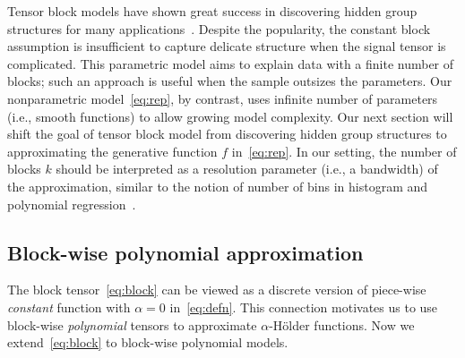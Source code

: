 \documentclass[12pt]{article}
\theoremstyle{definition}
\begin{document}
Tensor block models have shown great success in discovering hidden group structures for many applications~\cite{wang2019multiway,han2020exact}. Despite the popularity, the constant block assumption is insufficient to capture delicate structure when the signal tensor is complicated. 
This parametric model aims to explain data with a finite number of blocks; such an approach is useful when the sample outsizes the parameters. Our nonparametric model~\eqref{eq:rep}, by contrast, uses infinite number of parameters (i.e., smooth functions) to allow growing model complexity. Our next section will shift the goal of tensor block model from discovering hidden group structures to approximating the generative function $f$ in~\eqref{eq:rep}. In our setting, the number of blocks $k$ should be interpreted as a resolution parameter (i.e., a bandwidth) of the approximation, similar to the notion of number of bins in histogram and polynomial regression~\cite{wasserman2006all}. 

\subsection{Block-wise polynomial approximation}\label{sec:poly}
The block tensor~\eqref{eq:block} can be viewed as a discrete version of piece-wise \emph{constant} function with $\alpha=0$ in~\eqref{eq:defn}. This connection motivates us to use block-wise \emph{polynomial} tensors to approximate $\alpha$-H\"older functions. Now we extend~\eqref{eq:block} to block-wise polynomial models. 
\end{document}

